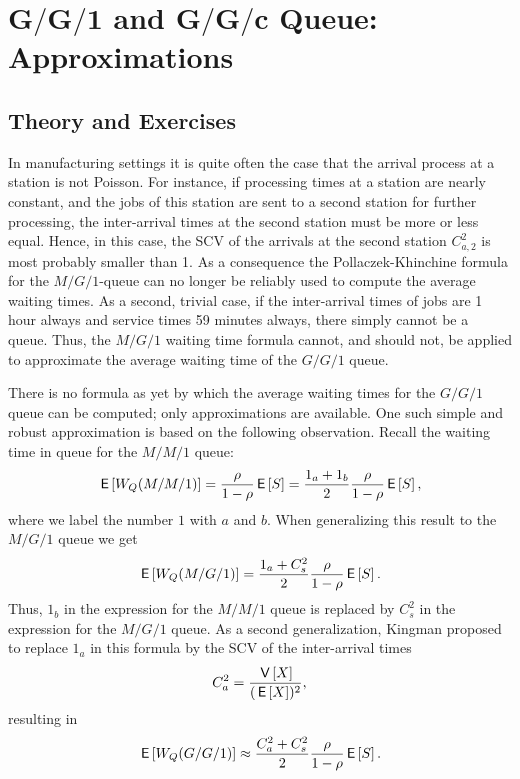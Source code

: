 \section
[$G/G/1$  and $G/G/c$ Queue: Approximations]
{$\mathbf{G/G/1}$  and $\mathbf{G/G/c}$ Queue: Approximations}
\label{sec:gg1}


\subsection*{Theory and Exercises}






In manufacturing settings it is quite often the case that the arrival
process at a station is not Poisson. For instance, if processing times
at a station are nearly constant, and the jobs of this station are
sent to a second station for further processing, the inter-arrival
times at the second station must be more or less equal. Hence, in this
case, the SCV of the arrivals at the second station $C_{a,2}^2$ is
most probably smaller than 1. As a consequence the
Pollaczek-Khinchine formula for the $M/G/1$-queue can no longer be
reliably used to compute the average waiting times.  As a second,
trivial case, if the inter-arrival times of jobs are 1 hour always and
service times 59 minutes always, there simply cannot be a queue. Thus,
the $M/G/1$ waiting time formula cannot, and should not, be applied to
approximate the average waiting time of the $G/G/1$ queue. 

There is no formula as yet by which the average waiting times for the
$G/G/1$ queue can be computed; only approximations are available. One
such simple and robust approximation is based on the following
observation. Recall  the waiting time in queue for the $M/M/1$ queue:
\begin{equation*}
  \,\mathsf{E}\left[W_Q(M/M/1)\right] = \frac{\rho}{1-\rho} \,\mathsf{E}\left[S\right] = 
\frac{1_a + 1_b}2 \frac{\rho}{1-\rho} \,\mathsf{E}\left[S\right],
\end{equation*}
where we label the number $1$ with $a$ and $b$. When generalizing this
result to the $M/G/1$ queue we get
\begin{equation*}
  \,\mathsf{E}\left[W_Q(M/G/1)\right] = \frac{1_a + C_s^2}2 \frac{\rho}{1-\rho} \,\mathsf{E}\left[S\right].
\end{equation*}
Thus, $1_b$ in the expression for the $M/M/1$ queue is replaced by
$C_s^2$ in the expression for the $M/G/1$ queue. As a second
generalization, Kingman proposed to replace $1_a$ in this formula by
the SCV of the inter-arrival times
\begin{equation*}
C_a^2 = \frac{\,\mathsf{V}\left[X\right]}{(\,\mathsf{E}\left[X\right])^2},
\end{equation*}
resulting in
\begin{equation*}
  \,\mathsf{E}\left[W_Q(G/G/1)\right] \approx \frac{C_a^2 + C_s^2}2 \frac{\rho}{1-\rho} \,\mathsf{E}\left[S\right].
\end{equation*}

